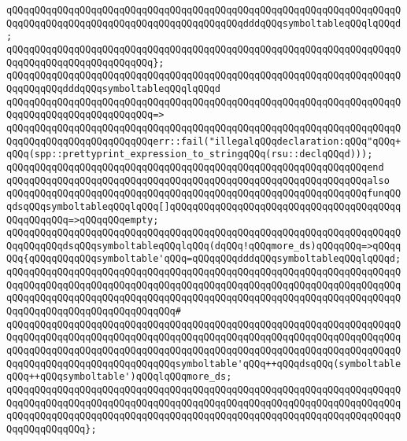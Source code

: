\verb|qQQqqQQqqQQqqQQqqQQqqQQqqQQqqQQqqQQqqQQqqQQqqQQqqQQqqQQqqQQqqQQqqQQqqQQqqQQqqQQqqQQqqQQqqQQqqQQqqQQqqQQqqQQqqQQqdddqQQqsymboltableqQQqlqQQqd;|\newline
\verb|qQQqqQQqqQQqqQQqqQQqqQQqqQQqqQQqqQQqqQQqqQQqqQQqqQQqqQQqqQQqqQQqqQQqqQQqqQQqqQQqqQQqqQQqqQQqqQQq};|\newline
\newline
\verb|qQQqqQQqqQQqqQQqqQQqqQQqqQQqqQQqqQQqqQQqqQQqqQQqqQQqqQQqqQQqqQQqqQQqqQQqqQQqqQQqdddqQQqsymboltableqQQqlqQQqd|\newline
\verb|qQQqqQQqqQQqqQQqqQQqqQQqqQQqqQQqqQQqqQQqqQQqqQQqqQQqqQQqqQQqqQQqqQQqqQQqqQQqqQQqqQQqqQQqqQQqqQQq=>|\newline
\verb|qQQqqQQqqQQqqQQqqQQqqQQqqQQqqQQqqQQqqQQqqQQqqQQqqQQqqQQqqQQqqQQqqQQqqQQqqQQqqQQqqQQqqQQqqQQqqQQqerr::fail("illegalqQQqdeclaration:qQQq"qQQq+qQQq(spp::prettyprint_expression_to_stringqQQq(rsu::declqQQqd)));|\newline
\verb|qQQqqQQqqQQqqQQqqQQqqQQqqQQqqQQqqQQqqQQqqQQqqQQqqQQqqQQqqQQqqQQqend|\newline
\newline
\verb|qQQqqQQqqQQqqQQqqQQqqQQqqQQqqQQqqQQqqQQqqQQqqQQqqQQqqQQqqQQqqQQqalso|\newline
\verb|qQQqqQQqqQQqqQQqqQQqqQQqqQQqqQQqqQQqqQQqqQQqqQQqqQQqqQQqqQQqqQQqfunqQQqdsqQQqsymboltableqQQqlqQQq[]qQQqqQQqqQQqqQQqqQQqqQQqqQQqqQQqqQQqqQQqqQQqqQQqqQQq=>qQQqqQQqempty;|\newline
\verb|qQQqqQQqqQQqqQQqqQQqqQQqqQQqqQQqqQQqqQQqqQQqqQQqqQQqqQQqqQQqqQQqqQQqqQQqqQQqqQQqdsqQQqsymboltableqQQqlqQQq(dqQQq!qQQqmore_ds)qQQqqQQq=>qQQqqQQq{qQQqqQQqqQQqsymboltable'qQQq=qQQqqQQqdddqQQqsymboltableqQQqlqQQqd;|\newline
\verb|qQQqqQQqqQQqqQQqqQQqqQQqqQQqqQQqqQQqqQQqqQQqqQQqqQQqqQQqqQQqqQQqqQQqqQQqqQQqqQQqqQQqqQQqqQQqqQQqqQQqqQQqqQQqqQQqqQQqqQQqqQQqqQQqqQQqqQQqqQQqqQQqqQQqqQQqqQQqqQQqqQQqqQQqqQQqqQQqqQQqqQQqqQQqqQQqqQQqqQQqqQQqqQQqqQQqqQQqqQQqqQQqqQQqqQQqqQQqqQQq#|\newline
\verb|qQQqqQQqqQQqqQQqqQQqqQQqqQQqqQQqqQQqqQQqqQQqqQQqqQQqqQQqqQQqqQQqqQQqqQQqqQQqqQQqqQQqqQQqqQQqqQQqqQQqqQQqqQQqqQQqqQQqqQQqqQQqqQQqqQQqqQQqqQQqqQQqqQQqqQQqqQQqqQQqqQQqqQQqqQQqqQQqqQQqqQQqqQQqqQQqqQQqqQQqqQQqqQQqqQQqqQQqqQQqqQQqqQQqqQQqqQQqqQQqsymboltable'qQQq++qQQqdsqQQq(symboltableqQQq++qQQqsymboltable')qQQqlqQQqmore_ds;|\newline
\verb|qQQqqQQqqQQqqQQqqQQqqQQqqQQqqQQqqQQqqQQqqQQqqQQqqQQqqQQqqQQqqQQqqQQqqQQqqQQqqQQqqQQqqQQqqQQqqQQqqQQqqQQqqQQqqQQqqQQqqQQqqQQqqQQqqQQqqQQqqQQqqQQqqQQqqQQqqQQqqQQqqQQqqQQqqQQqqQQqqQQqqQQqqQQqqQQqqQQqqQQqqQQqqQQqqQQqqQQqqQQqqQQq};|\newline
